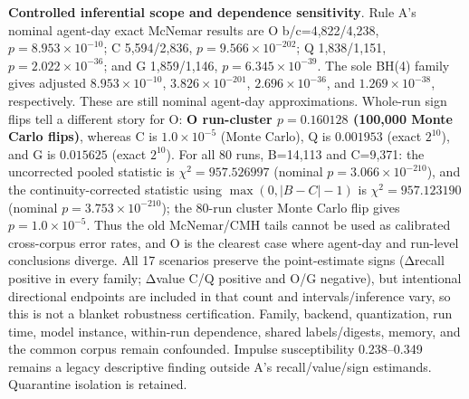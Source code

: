 \documentclass[
  11pt]{article}
\begin{document}
\textbf{Controlled inferential scope and dependence sensitivity}. Rule
A's nominal agent-day exact McNemar results are O b/c=4,822/4,238,
\(p=8.953\times10^{-10}\); C 5,594/2,836, \(p=9.566\times10^{-202}\); Q
1,838/1,151, \(p=2.022\times10^{-36}\); and G 1,859/1,146,
\(p=6.345\times10^{-39}\). The sole BH(4) family gives adjusted
\(8.953\times10^{-10}\), \(3.826\times10^{-201}\),
\(2.696\times10^{-36}\), and \(1.269\times10^{-38}\), respectively.
These are still nominal agent-day approximations. Whole-run sign flips
tell a different story for O: \textbf{O run-cluster \(p=0.160128\)
(100,000 Monte Carlo flips)}, whereas C is \(1.0\times10^{-5}\) (Monte
Carlo), Q is \(0.001953\) (exact \(2^{10}\)), and G is \(0.015625\)
(exact \(2^{10}\)). For all 80 runs, B=14,113 and C=9,371: the
uncorrected pooled statistic is \(\chi^2=957.526997\) (nominal
\(p=3.066\times10^{-210}\)), and the continuity-corrected statistic
using \(\max(0,|B-C|-1)\) is \(\chi^2=957.123190\) (nominal
\(p=3.753\times10^{-210}\)); the 80-run cluster Monte Carlo flip gives
\(p=1.0\times10^{-5}\). Thus the old McNemar/CMH tails cannot be used as
calibrated cross-corpus error rates, and O is the clearest case where
agent-day and run-level conclusions diverge. All 17 scenarios preserve
the point-estimate signs (Δrecall positive in every family; Δvalue C/Q
positive and O/G negative), but intentional directional endpoints are
included in that count and intervals/inference vary, so this is not a
blanket robustness certification. Family, backend, quantization, run
time, model instance, within-run dependence, shared labels/digests,
memory, and the common corpus remain confounded. Impulse susceptibility
0.238--0.349 remains a legacy descriptive finding outside A's
recall/value/sign estimands. Quarantine isolation is retained.
\end{document}
